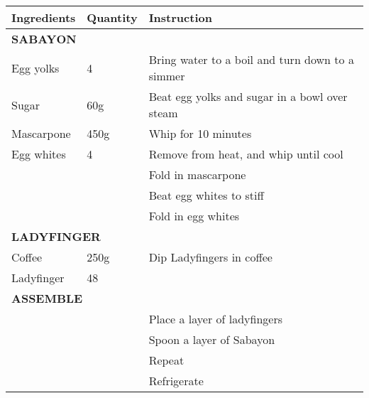 \documentclass{article}
\newcommand{\tabletitle}[1]{\midrule\multicolumn{3}{l}{\textbf{\color{BrickRed} \MakeUppercase{#1}}}}
\begin{document}
\begin{tabular}{lll} \toprule
  \textbf{Ingredients} & \textbf{Quantity} & \textbf{Instruction}                            \\
  \tabletitle{Sabayon}                                                                       \\
  Egg yolks            & 4                 & Bring water to a boil and turn down to a simmer \\
  Sugar                & 60g               & Beat egg yolks and sugar in a bowl over steam   \\
  Mascarpone           & 450g              & Whip for 10 minutes                             \\
  Egg whites           & 4                 & Remove from heat, and whip until cool           \\
                       &                   & Fold in mascarpone                              \\
                       &                   & Beat egg whites to stiff                        \\
                       &                   & Fold in egg whites                              \\
  \tabletitle{Ladyfinger}                                                                    \\
  Coffee               & 250g              & Dip Ladyfingers in coffee                       \\
  Ladyfinger           & 48                &                                                 \\
  \tabletitle{Assemble}                                                                      \\
                       &                   & Place a layer of ladyfingers                    \\
                       &                   & Spoon a layer of Sabayon                        \\
                       &                   & Repeat                                          \\
                       &                   & Refrigerate                                     \\
  \bottomrule
\end{tabular}
\end{document}
